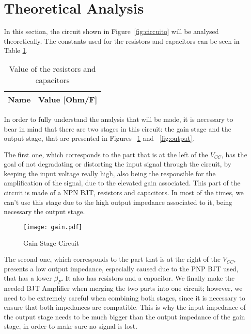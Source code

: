\section{Theoretical Analysis}
\label{sec:analysis}

\hspace{0,5cm} In this section, the  circuit shown in Figure~\ref{fig:circuito} will be analysed theoretically.
The constants used for the resistors and capacitors can be seen in Table \ref{tab:mat1}.

\begin{table}[H]
  \centering
  \begin{tabular}{|l|r|}
    \hline    
    {\bf Name} & {\bf Value [Ohm/F]} \\ \hline
    
  \end{tabular}
  \caption{Value of the resistors and capacitors}
  \label{tab:mat1}
\end{table}

\par In order to fully understand the analysis that will be made, it is necessary to bear in mind that there are two stages in this circuit: the gain stage and the output stage, that are presented in Figures ~\ref{fig:gain} and ~\ref{fig:output}. 

\par The first one, which corresponds to the part that is at the left of the $V_{CC}$, has the goal of not degradating or distorting the input signal through the circuit, by keeping the input voltage really high, also being the responsible for the amplification of the signal, due to the elevated gain associated. This part of the circuit is made of a NPN BJT, resistors and capacitors. In most of the times, we can't use this stage due to the high output impedance associated to it, being necessary the output stage.


\begin{figure}[H] \centering
\texttt{[image: gain.pdf]}
\caption{Gain Stage Circuit}
\label{fig:gain}
\end{figure}


\par The second one, which corresponds to the part that is at the right of the $V_{CC}$, presents a low output impedance, especially caused due to the PNP BJT used, that has a lower $\beta_F$. It also has resistors and a capacitor. We finally make the needed BJT Amplifier when merging the two parts into one circuit; however, we need to be extremely careful when combining both stages, since it is necessary to ensure that both impedances are compatible. This is why the input impedance of the output stage needs to be much bigger than the output impedance of the gain stage, in order to make sure no signal is lost.

